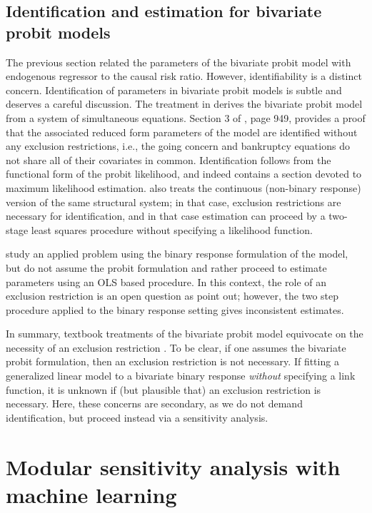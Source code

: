 \documentclass[aoas,preprint, 11pt, dvipsnames, table, x11name]{imsart}
\theoremstyle{remark}
\begin{document}
	\subsection{Identification and estimation for bivariate probit models}\label{techremarks}
	
	The previous section related the parameters of the bivariate probit model with endogenous regressor to the causal risk ratio. However, identifiability is a distinct concern. Identification of parameters in bivariate probit models is subtle and deserves a careful discussion. The treatment in \cite{Heckman-1978} derives the bivariate probit model from a system of simultaneous equations.  Section 3 of \cite{Heckman-1978}, page 949, provides a proof that the associated reduced form parameters of the model are identified without any exclusion restrictions, i.e., the going concern and bankruptcy equations do not share all of their covariates in common.  Identification follows from the functional form of the probit likelihood, and indeed \cite{Heckman-1978} contains a section devoted to maximum likelihood estimation.  \cite{Heckman-1978} also treats the continuous (non-binary response) version of the same structural system; in that case, exclusion restrictions are necessary for identification, and in that case estimation can proceed by a two-stage least squares procedure without specifying a likelihood function.  
	
	\cite{Evans-Schwab-1995} study an applied problem using the binary response formulation of the \cite{Heckman-1978} model, but do not assume the probit formulation and rather proceed to estimate parameters using an OLS based procedure.  In this context, the role of an exclusion restriction is an open question as  \cite{Altonji-Elder-Taber-2005} point out; however, the two step procedure applied to the binary response setting gives inconsistent estimates. 
	
	In summary, textbook treatments of the bivariate probit model equivocate on the necessity of an exclusion restriction \citep[Chapter~15]{Wooldridge-2010}.  To be clear, if one assumes the bivariate probit formulation, then an exclusion restriction is not necessary.  If fitting a generalized linear model to a bivariate binary response {\em without} specifying a link function, it is unknown if (but plausible that) an exclusion restriction is necessary. Here, these concerns are secondary, as we do not demand identification, but proceed instead via a sensitivity analysis.
	
	\section{Modular sensitivity analysis with machine learning}\label{section_indirect_inference}
	
\end{document}
